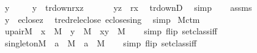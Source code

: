\begin{isabellebody}
\ y\isanewline
\ \ \isamarkupfalse%
\ \ {\isachardoublequoteopen}y\ {\isasymin}\ tr{\isacharunderscore}{\kern0pt}down{\isacharparenleft}{\kern0pt}{\isacharquery}{\kern0pt}r{\isacharparenleft}{\kern0pt}x{\isacharparenright}{\kern0pt}{\isacharcomma}{\kern0pt}z{\isacharparenright}{\kern0pt}{\isachardoublequoteclose}\isanewline
\ \ \isamarkupfalse%
\isanewline
\ \ \isamarkupfalse%
\ {\isachardoublequoteopen}{\isasymlangle}y{\isacharcomma}{\kern0pt}z{\isasymrangle}\ {\isasymin}\ {\isacharquery}{\kern0pt}r{\isacharparenleft}{\kern0pt}x{\isacharparenright}{\kern0pt}{\isacharcircum}{\kern0pt}{\isacharplus}{\kern0pt}{\isachardoublequoteclose}\ \isamarkupfalse%
\ tr{\isacharunderscore}{\kern0pt}downD\ \isamarkupfalse%
\ simp\isanewline
\ \ \isamarkupfalse%
\ assms\isanewline
\ \ \isamarkupfalse%
\ {\isachardoublequoteopen}y\ {\isasymin}\ eclose{\isacharparenleft}{\kern0pt}{\isacharbraceleft}{\kern0pt}z{\isacharbraceright}{\kern0pt}{\isacharparenright}{\kern0pt}{\isachardoublequoteclose}\ \isamarkupfalse%
\ tr{\isacharunderscore}{\kern0pt}edrel{\isacharunderscore}{\kern0pt}eclose\ eclose{\isacharunderscore}{\kern0pt}sing\ \isamarkupfalse%
\ simp\isanewline
{}\isamarkupfalse%
%
\endisatagproof
{\isafoldproof}%
%
\isadelimproof
\isanewline
%
\endisadelimproof
\isanewline
\isanewline
{}\isamarkupfalse%
\ M{\isacharunderscore}{\kern0pt}ctm\isanewline
{}\isanewline
\isanewline
{}\isamarkupfalse%
\ upairM\ {\isacharcolon}{\kern0pt}\ {\isachardoublequoteopen}x\ {\isasymin}\ M\ {\isasymLongrightarrow}\ y\ {\isasymin}\ M\ {\isasymLongrightarrow}\ {\isacharbraceleft}{\kern0pt}x{\isacharcomma}{\kern0pt}y{\isacharbraceright}{\kern0pt}\ {\isasymin}\ M{\isachardoublequoteclose}\isanewline
%
\isadelimproof
\ \ %
\endisadelimproof
%
\isatagproof
{}\isamarkupfalse%
\ {\isacharparenleft}{\kern0pt}simp\ flip{\isacharcolon}{\kern0pt}\ setclass{\isacharunderscore}{\kern0pt}iff{\isacharparenright}{\kern0pt}%
\endisatagproof
{\isafoldproof}%
%
\isadelimproof
\isanewline
%
\endisadelimproof
\isanewline
{}\isamarkupfalse%
\ singletonM\ {\isacharcolon}{\kern0pt}\ {\isachardoublequoteopen}a\ {\isasymin}\ M\ {\isasymLongrightarrow}\ {\isacharbraceleft}{\kern0pt}a{\isacharbraceright}{\kern0pt}\ {\isasymin}\ M{\isachardoublequoteclose}\isanewline
%
\isadelimproof
\ \ %
\endisadelimproof
%
\isatagproof
{}\isamarkupfalse%
\ {\isacharparenleft}{\kern0pt}simp\ flip{\isacharcolon}{\kern0pt}\ setclass{\isacharunderscore}{\kern0pt}iff{\isacharparenright}{\kern0pt}%

\end{isabellebody}
